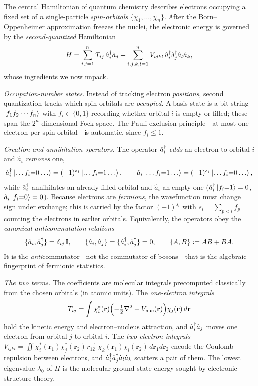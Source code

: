 \begin{example}
\label{exa:lec05-fermion}
The central Hamiltonian of quantum chemistry describes electrons occupying a fixed
set of $n$ single-particle \emph{spin-orbitals} $\{\chi_1,\dots,\chi_n\}$. After the
Born--Oppenheimer approximation freezes the nuclei, the electronic energy is
governed by the \emph{second-quantized} Hamiltonian
\[
  H=\sum_{i,j=1}^{n} T_{ij}\,\hat a_i^{\dagger}\hat a_j
   +\sum_{i,j,k,l=1}^{n} V_{ijkl}\,\hat a_i^{\dagger}\hat a_j^{\dagger}\hat a_l\hat a_k,
\]
whose ingredients we now unpack.

\emph{Occupation-number states.} Instead of tracking electron \emph{positions},
second quantization tracks which spin-orbitals are \emph{occupied}. A basis state is
a bit string $\ket{f_1 f_2\cdots f_n}$ with $f_i\in\{0,1\}$ recording whether orbital
$i$ is empty or filled; these span the $2^{n}$-dimensional Fock space. The Pauli
exclusion principle---at most one electron per spin-orbital---is automatic, since
$f_i\le1$.

\emph{Creation and annihilation operators.} The operator $\hat a_i^{\dagger}$ \emph{adds} an
electron to orbital $i$ and $\hat a_i$ \emph{removes} one,
\[
  \hat a_i^{\dagger}\ket{\dots f_i{=}0\dots}=(-1)^{s_i}\ket{\dots f_i{=}1\dots},\qquad
  \hat a_i\ket{\dots f_i{=}1\dots}=(-1)^{s_i}\ket{\dots f_i{=}0\dots},
\]
while $\hat a_i^{\dagger}$ annihilates an already-filled orbital and $\hat a_i$ an empty one
($\hat a_i^{\dagger}\ket{f_i{=}1}=0$, $\hat a_i\ket{f_i{=}0}=0$). Because electrons are
\emph{fermions}, the wavefunction must change sign under exchange; this is carried by
the factor $(-1)^{s_i}$ with $s_i=\sum_{p<i}f_p$ counting the electrons in earlier
orbitals. Equivalently, the operators obey the \emph{canonical anticommutation
relations}
\[
  \{\hat a_i,\hat a_j^{\dagger}\}=\delta_{ij}\,\mathbb{I},\qquad
  \{\hat a_i,\hat a_j\}=\{\hat a_i^{\dagger},\hat a_j^{\dagger}\}=0,
  \qquad \{A,B\}\vcentcolon= AB+BA.
\]
It is the \emph{anti}commutator---not the commutator of bosons---that is the
algebraic fingerprint of fermionic statistics.

\emph{The two terms.} The coefficients are molecular integrals precomputed classically
from the chosen orbitals (in atomic units). The \emph{one-electron integrals}
\[
  T_{ij}=\int\chi_i^{*}(\mathbf r)\Bigl(-\tfrac12\nabla^{2}+V_{\mathrm{nuc}}(\mathbf r)\Bigr)
          \chi_j(\mathbf r)\,d\mathbf r
\]
hold the kinetic energy and electron--nucleus attraction, and $\hat a_i^{\dagger}\hat a_j$
moves one electron from orbital $j$ to orbital $i$. The \emph{two-electron integrals}
$V_{ijkl}=\iint\chi_i^{*}(\mathbf r_1)\chi_j^{*}(\mathbf r_2)\,r_{12}^{-1}\,
\chi_k(\mathbf r_1)\chi_l(\mathbf r_2)\,d\mathbf r_1 d\mathbf r_2$ encode the Coulomb
repulsion between electrons, and $\hat a_i^{\dagger}\hat a_j^{\dagger}\hat a_l\hat a_k$ scatters a
pair of them. The lowest eigenvalue $\lambda_0$ of $H$ is the molecular ground-state
energy sought by electronic-structure theory.


\end{example}
